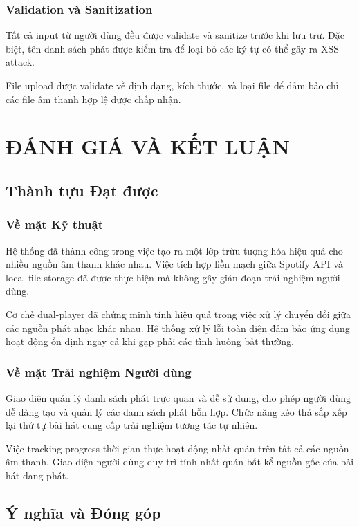 \documentclass[12pt,a4paper]{article}
\begin{document}
\subsubsection{Validation và Sanitization}

Tất cả input từ người dùng đều được validate và sanitize trước khi lưu trữ. Đặc biệt, tên danh sách phát được kiểm tra để loại bỏ các ký tự có thể gây ra XSS attack.

File upload được validate về định dạng, kích thước, và loại file để đảm bảo chỉ các file âm thanh hợp lệ được chấp nhận.

\section{ĐÁNH GIÁ VÀ KẾT LUẬN}

\subsection{Thành tựu Đạt được}

\subsubsection{Về mặt Kỹ thuật}

Hệ thống đã thành công trong việc tạo ra một lớp trừu tượng hóa hiệu quả cho nhiều nguồn âm thanh khác nhau. Việc tích hợp liền mạch giữa Spotify API và local file storage đã được thực hiện mà không gây gián đoạn trải nghiệm người dùng.

Cơ chế dual-player đã chứng minh tính hiệu quả trong việc xử lý chuyển đổi giữa các nguồn phát nhạc khác nhau. Hệ thống xử lý lỗi toàn diện đảm bảo ứng dụng hoạt động ổn định ngay cả khi gặp phải các tình huống bất thường.

\subsubsection{Về mặt Trải nghiệm Người dùng}

Giao diện quản lý danh sách phát trực quan và dễ sử dụng, cho phép người dùng dễ dàng tạo và quản lý các danh sách phát hỗn hợp. Chức năng kéo thả sắp xếp lại thứ tự bài hát cung cấp trải nghiệm tương tác tự nhiên.

Việc tracking progress thời gian thực hoạt động nhất quán trên tất cả các nguồn âm thanh. Giao diện người dùng duy trì tính nhất quán bất kể nguồn gốc của bài hát đang phát.

\subsection{Ý nghĩa và Đóng góp}
\end{document}
